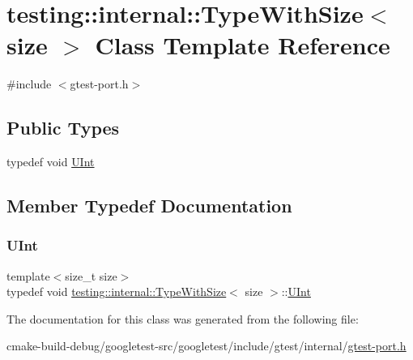 \hypertarget{classtesting_1_1internal_1_1TypeWithSize}{}\section{testing\+::internal\+::Type\+With\+Size$<$ size $>$ Class Template Reference}
\label{classtesting_1_1internal_1_1TypeWithSize}


{\ttfamily \#include $<$gtest-\/port.\+h$>$}

\subsection*{Public Types}
\begin{DoxyCompactItemize}
\item 
typedef void \mbox{\hyperlink{classtesting_1_1internal_1_1TypeWithSize_a3898640d9f6c1e18110eef90f47a5d7b}{U\+Int}}
\end{DoxyCompactItemize}


\subsection{Member Typedef Documentation}
\mbox{\label{classtesting_1_1internal_1_1TypeWithSize_a3898640d9f6c1e18110eef90f47a5d7b}} 
\subsubsection{\texorpdfstring{UInt}{UInt}}
{\footnotesize\ttfamily template$<$size\+\_\+t size$>$ \\
typedef void \mbox{\hyperlink{classtesting_1_1internal_1_1TypeWithSize}{testing\+::internal\+::\+Type\+With\+Size}}$<$ size $>$\+::\mbox{\hyperlink{classtesting_1_1internal_1_1TypeWithSize_a3898640d9f6c1e18110eef90f47a5d7b}{U\+Int}}}



The documentation for this class was generated from the following file\+:\begin{DoxyCompactItemize}
\item 
cmake-\/build-\/debug/googletest-\/src/googletest/include/gtest/internal/\mbox{\hyperlink{gtest-port_8h}{gtest-\/port.\+h}}\end{DoxyCompactItemize}
